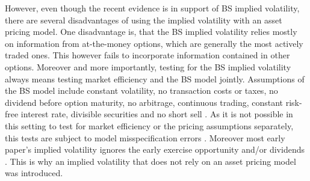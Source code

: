 However, even though the recent evidence is in support of \gls{BS} implied volatility, there are several disadvantages of using the implied volatility with an asset pricing model. One disadvantage is, that the \gls{BS} implied volatility relies mostly on information from at-the-money options, which are generally the most actively traded ones. This however fails to incorporate information contained in other options. Moreover and more importantly, testing for the \gls{BS} implied volatility always means testing market efficiency and the \gls{BS} model jointly. Assumptions of the \gls{BS} model include constant volatility, no transaction costs or taxes, no dividend before option maturity, no arbitrage, continuous trading, constant risk-free interest rate, divisible securities and no short sell \parencite{poon2003}. As it is not possible in this setting to test for market efficiency or the pricing assumptions separately, this tests are subject to model misspecification errors \parencite{jiang2003}. Moreover most early paper's implied volatility ignores the early exercise opportunity and/or dividends \parencite{blair2000}. This is why an implied volatility that does not rely on an asset pricing model was introduced. 


